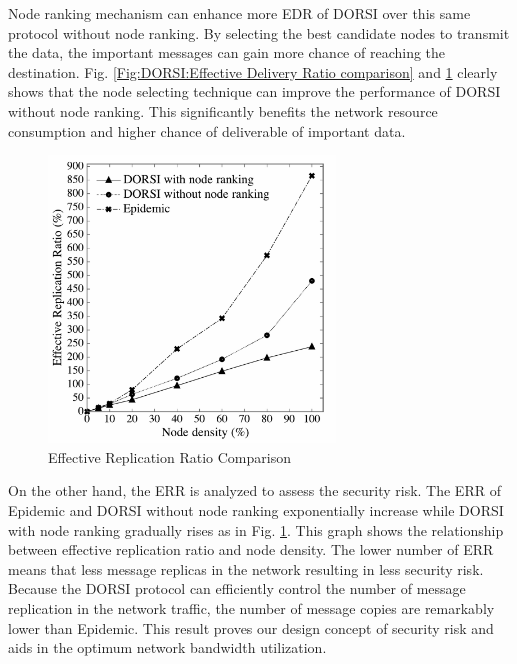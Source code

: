 Node ranking mechanism can enhance more EDR of DORSI over this same protocol without node ranking. 
By selecting the best candidate nodes to transmit the data, the important messages can gain more chance of reaching the destination. 
Fig. \ref{Fig:DORSI:Effective Delivery Ratio comparison} and \ref{Fig:DORSI:Effective Replication Ration Comparison} clearly shows that the node selecting technique can improve the performance of DORSI without node ranking. 
This significantly benefits the network resource consumption and higher chance of deliverable of important data.

\begin{figure}[!h]
\centering
\includegraphics[width=3in]{Graphs/EffectiveReplicationRationComparison.pdf}
\caption{Effective Replication Ratio Comparison}
\label{Fig:DORSI:Effective Replication Ration Comparison}
\end{figure}

On the other hand, the ERR is analyzed to assess the security risk. 
The ERR of Epidemic and DORSI without node ranking exponentially increase while DORSI with node ranking gradually rises as in Fig. \ref{Fig:DORSI:Effective Replication Ration Comparison}. 
This graph shows the relationship between effective replication ratio and node density. 
The lower number of ERR means that less message replicas in the network resulting in less security risk. 
Because the DORSI protocol can efficiently control the number of message replication in the network traffic, the number of message copies are remarkably lower than Epidemic. 
This result proves our design concept of security risk and aids in the optimum network bandwidth utilization.

